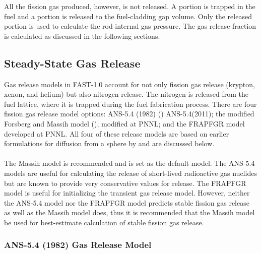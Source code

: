 All the fission gas produced, however, is not released. A portion is trapped in the fuel and a
portion is released to the fuel-cladding gap volume. Only the released portion is used to calculate
the rod internal gas pressure. The gas release fraction is calculated as discussed in the following
sections.

\subsection{Steady-State Gas Release} \label{section:steady-state-gas-release}

Gas release models in FAST-1.0 account for not only fission gas release (krypton, xenon, and helium)
but also nitrogen release. The nitrogen is released from the fuel lattice, where it is trapped
during the fuel fabrication process. There are four fission gas release model options: ANS-5.4
(1982) (\cite{ref:Rausch1979}) ANS-5.4(2011); the modified Forsberg and Massih
model (\cite{ref:Forsberg1985}), modified at PNNL; and the FRAPFGR model
developed at PNNL. All four of these release models are based on earlier formulations for diffusion
from a sphere by \cite{ref:Booth1957} and are discussed below.
\\
\\
The Massih model is recommended and is set as the default model. The ANS-5.4 models are useful for
calculating the release of short-lived radioactive gas nuclides but are known to provide very
conservative values for release. The FRAPFGR model is useful for initializing the transient gas
release model. However, neither the ANS-5.4 model nor the FRAPFGR model predicts stable fission gas
release as well as the Massih model does, thus it is recommended that the Massih model be used for
best-estimate calculation of stable fission gas release.

\subsubsection{ANS-5.4 (1982) Gas Release Model} \label{section:ans-5.4-1982-gas-release-model}

